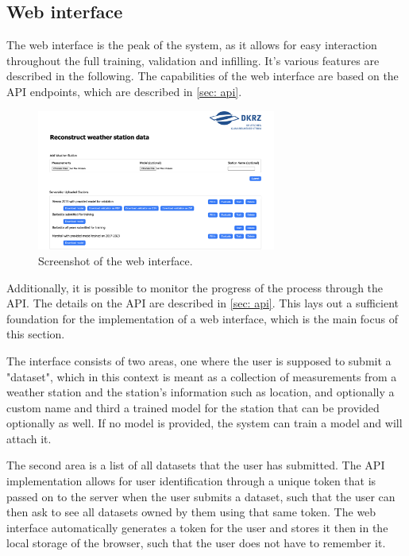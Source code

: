 \subsection{Web interface}

The web interface is the peak of the system, as it allows for easy interaction throughout the full training, validation and infilling.
It's various features are described in the following. The capabilities of the web interface are based on the API endpoints, which are described in \autoref{sec: api}.

\begin{figure}
    \centering
    \includegraphics[width=0.7\textwidth]{resources/images/webinterface_screenshot.png}
    \caption{Screenshot of the web interface.}
    \label{fig: webinterface_screenshot}
    \end{figure}
Additionally, it is possible to monitor the progress of the process through the API.
The details on the API are described in \autoref{sec: api}.
This lays out a sufficient foundation for the implementation of a web interface, which is the main focus of this section.

The interface consists of two areas, one where the user is supposed to submit a "dataset", which in this context is meant as a collection of measurements from a weather station and the station's information such as location, and optionally a custom name and third a trained model for the station that can be provided optionally as well.
If no model is provided, the system can train a model and will attach it.

The second area is a list of all datasets that the user has submitted.
The API implementation allows for user identification through a unique token that is passed on to the server when the user submits a dataset, such that the user can then ask to see all datasets owned by them using that same token.
The web interface automatically generates a token for the user and stores it then in the local storage of the browser, such that the user does not have to remember it.

